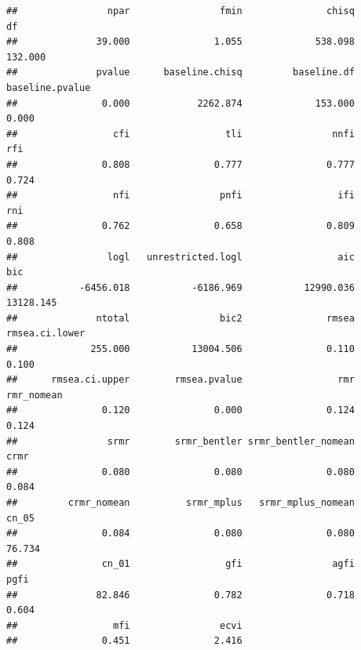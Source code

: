 \documentclass[
]{book}
\begin{document}
\begin{verbatim}
##                npar                fmin               chisq                  df 
##              39.000               1.055             538.098             132.000 
##              pvalue      baseline.chisq         baseline.df     baseline.pvalue 
##               0.000            2262.874             153.000               0.000 
##                 cfi                 tli                nnfi                 rfi 
##               0.808               0.777               0.777               0.724 
##                 nfi                pnfi                 ifi                 rni 
##               0.762               0.658               0.809               0.808 
##                logl   unrestricted.logl                 aic                 bic 
##           -6456.018           -6186.969           12990.036           13128.145 
##              ntotal                bic2               rmsea      rmsea.ci.lower 
##             255.000           13004.506               0.110               0.100 
##      rmsea.ci.upper        rmsea.pvalue                 rmr          rmr_nomean 
##               0.120               0.000               0.124               0.124 
##                srmr        srmr_bentler srmr_bentler_nomean                crmr 
##               0.080               0.080               0.080               0.084 
##         crmr_nomean          srmr_mplus   srmr_mplus_nomean               cn_05 
##               0.084               0.080               0.080              76.734 
##               cn_01                 gfi                agfi                pgfi 
##              82.846               0.782               0.718               0.604 
##                 mfi                ecvi 
##               0.451               2.416
\end{verbatim}
\end{document}
